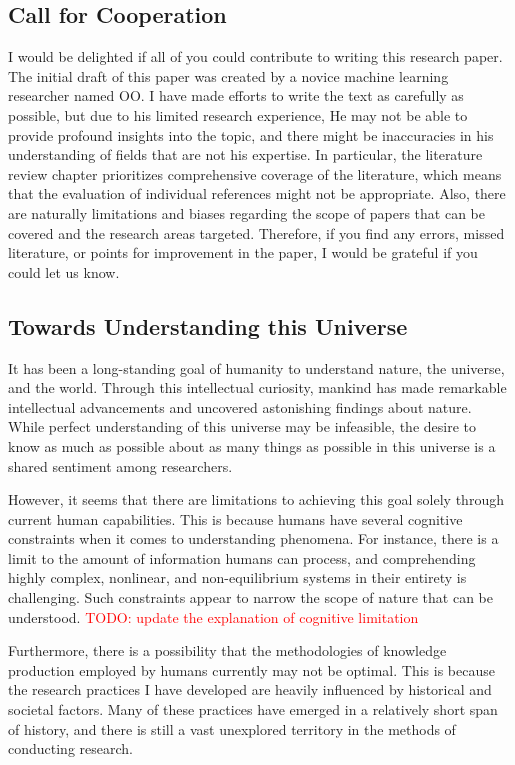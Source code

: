\documentclass{article}
\begin{document}
\subsection{Call for Cooperation}
I would be delighted if all of you could contribute to writing this research paper. The initial draft of this paper was created by a novice machine learning researcher named OO. I have made efforts to write the text as carefully as possible, but due to his limited research experience, He may not be able to provide profound insights into the topic, and there might be inaccuracies in his understanding of fields that are not his expertise. In particular, the literature review chapter prioritizes comprehensive coverage of the literature, which means that the evaluation of individual references might not be appropriate. Also, there are naturally limitations and biases regarding the scope of papers that can be covered and the research areas targeted. Therefore, if you find any errors, missed literature, or points for improvement in the paper, I would be grateful if you could let us know.



\subsection{Towards Understanding this Universe}
It has been a long-standing goal of humanity to understand nature, the universe, and the world. Through this intellectual curiosity, mankind has made remarkable intellectual advancements and uncovered astonishing findings about nature. While perfect understanding of this universe may be infeasible, the desire to know as much as possible about as many things as possible in this universe is a shared sentiment among researchers.

However, it seems that there are limitations to achieving this goal solely through current human capabilities. This is because humans have several cognitive constraints when it comes to understanding phenomena. For instance, there is a limit to the amount of information humans can process, and comprehending highly complex, nonlinear, and non-equilibrium systems in their entirety is challenging. Such constraints appear to narrow the scope of nature that can be understood. \textcolor{red}{TODO: update the explanation of cognitive limitation}

Furthermore, there is a possibility that the methodologies of knowledge production employed by humans currently may not be optimal. This is because the research practices I have developed are heavily influenced by historical and societal factors. Many of these practices have emerged in a relatively short span of history, and there is still a vast unexplored territory in the methods of conducting research.
\end{document}
